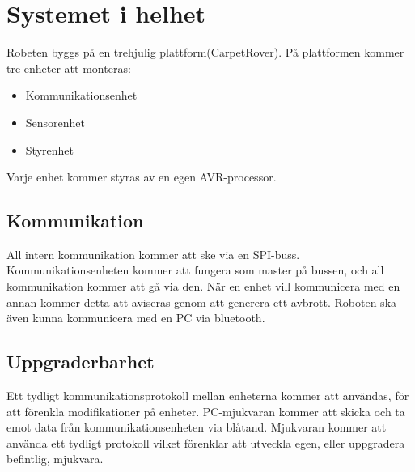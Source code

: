 \section{Systemet i helhet}
Robeten byggs på en trehjulig plattform(CarpetRover). På plattformen kommer tre enheter att monteras:
\begin{itemize}
        \item Kommunikationsenhet
        \item Sensorenhet
        \item Styrenhet
\end{itemize}
Varje enhet kommer styras av en egen AVR-processor.

\subsection{Kommunikation}
All intern kommunikation kommer att ske via en SPI-buss. Kommunikationsenheten kommer att fungera som master på bussen, och all kommunikation kommer att gå via den. När en enhet vill kommunicera med en annan kommer detta att aviseras genom att generera ett avbrott. 
Roboten ska även kunna kommunicera med en PC via bluetooth.

\subsection{Uppgraderbarhet}
Ett tydligt kommunikationsprotokoll mellan enheterna kommer att användas, för att förenkla modifikationer på enheter. PC-mjukvaran kommer att skicka och ta emot data från kommunikationsenheten via blåtand.
Mjukvaran kommer att använda ett tydligt protokoll vilket förenklar att utveckla egen, eller uppgradera befintlig, mjukvara.
